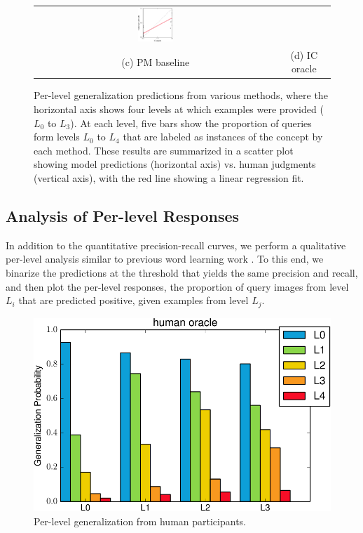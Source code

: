 \begin{figure}[t]
\begin{tabular}{cc}
        \includegraphics[width=0.15\textwidth]{figs/vcl/correlation_ic.pdf} \vspace{-0.0in}\\
        (c) PM baseline & (d) IC oracle \\
    \end{tabular}\vspace{-0.1in}
\caption{Per-level generalization predictions from various methods, where the horizontal axis shows four levels at which examples were provided ($L_0$ to $L_3$). At each level, five bars show the proportion of queries form levels $L_0$ to $L_4$ that are labeled as instances of the concept by each method. These results are summarized in a scatter plot showing model predictions (horizontal axis) vs. human judgments (vertical axis), with the red line showing a linear regression fit.}\label{fig:bars}\vspace{-0.1in}
\end{figure}

\subsection{Analysis of Per-level Responses}\label{subsec:bars}

In addition to the quantitative precision-recall curves, we perform a qualitative per-level analysis similar to previous word learning work \cite{abbott2012}. To this end, we binarize the predictions at the threshold that yields the same precision and recall, and then plot the per-level responses, \ie the proportion of query images from level $L_i$ that are predicted positive, given examples from level $L_j$.

\begin{figure}
    \centering
    \includegraphics[width=0.9\linewidth]{figs/vcl/per_level_response_human.pdf}\vspace{-0.15in}
    \caption{Per-level generalization from human participants.}\label{fig:humanbars}
\end{figure}

